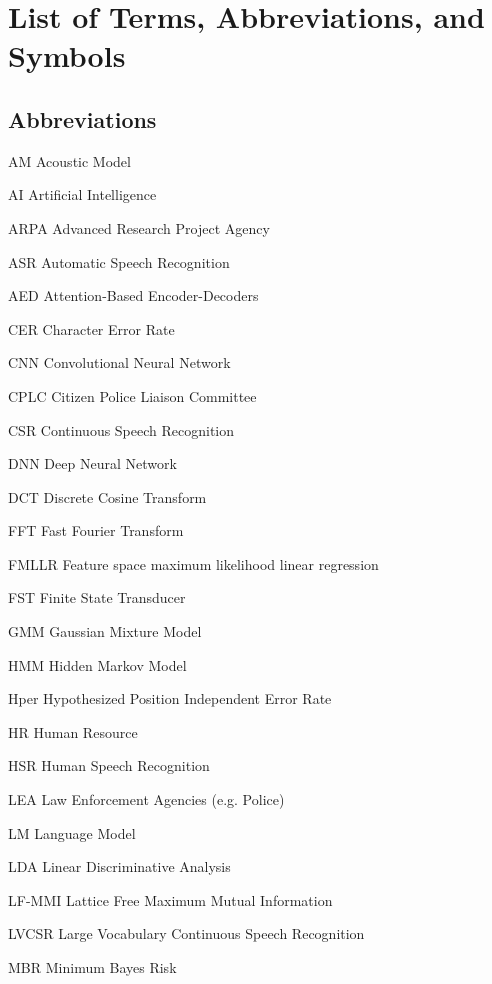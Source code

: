 
\newpage
    \chapter*{List of Terms, Abbreviations, and Symbols}
    \section*{Abbreviations}
    \begin{acronyms}
    \item[AM] Acoustic Model    
    \item[AI] Artificial Intelligence
    \item [ARPA] Advanced Research Project Agency
    \item[ASR] Automatic Speech Recognition
    \item [AED] Attention-Based Encoder-Decoders 
    \item [CER] Character Error Rate
    \item [CNN] Convolutional Neural Network
    \item [CPLC] Citizen Police Liaison Committee 
    \item [CSR] Continuous Speech Recognition
    \item[DNN] Deep Neural Network    
    \item[DCT] Discrete Cosine Transform    
    \item[FFT] Fast Fourier Transform
    \item [FMLLR] Feature space maximum likelihood linear regression
    \item[FST] Finite State Transducer
    \item[GMM] Gaussian Mixture Model
    \item[HMM] Hidden Markov Model
    \item [Hper] Hypothesized Position Independent Error Rate
    \item[HR] Human Resource
    \item [HSR] Human Speech Recognition
    \item [LEA] Law Enforcement Agencies (e.g. Police)
    \item[LM] Language Model
    \item [LDA] Linear Discriminative Analysis
    \item [LF-MMI] Lattice Free Maximum Mutual Information
    \item [LVCSR] Large Vocabulary Continuous Speech Recognition
    \item [MBR] Minimum Bayes Risk

\end{acronyms}
